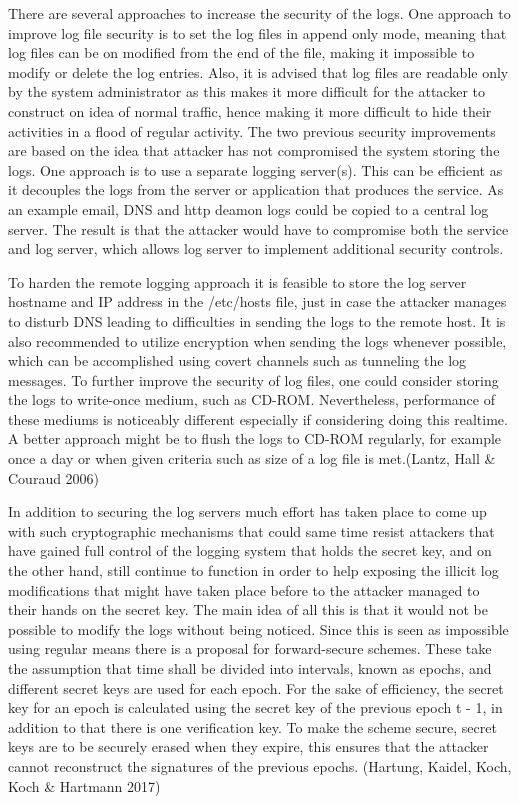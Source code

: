 \documentclass{article}
\begin{document}
There are several approaches to increase the security of the logs. One approach to improve log file security is to set the log files in append only mode, meaning that log files can be on modified from the end of the file, making it impossible to modify or delete the log entries. Also, it is advised that log files are readable only by the system administrator as this makes it more difficult for the attacker to construct on idea of normal traffic, hence making it more difficult to hide their activities in a flood of regular activity. The two previous security improvements are based on the idea that attacker has not compromised the system storing the logs.  One approach is to use a separate logging server(s). This can be efficient as it decouples the logs from the server or application that produces the service. As an example email, DNS and http deamon logs could be copied to a central log server. The result is that the attacker would have to compromise both the service and log server, which allows log server to implement additional security controls.
\par
To harden the remote logging approach it is feasible to store the log server hostname and IP address in the /etc/hosts file, just in case the attacker manages to disturb DNS leading to difficulties in sending the logs to the remote host. It is also recommended to utilize encryption when sending the logs whenever possible, which can be accomplished using covert channels such as tunneling the log messages. To further improve the security of log files, one could consider storing the logs to write-once medium, such as CD-ROM. Nevertheless, performance of these mediums is noticeably different especially if considering doing this realtime. A better approach might be to flush the logs to CD-ROM regularly, for example once a day or when given criteria such as size of a log file is met.(Lantz, Hall \& Couraud 2006)
\par
In addition to securing the log servers much effort has taken place to come up with such cryptographic mechanisms that could same time resist attackers that have gained full control of the logging system that holds the secret key, and on the other hand, still continue to function in order to help exposing the illicit log modifications that might have taken place before to the attacker managed to their hands on the secret key. The main idea of all this is that it would not be possible to modify the logs without being noticed. Since this is seen as impossible using regular means there is a proposal for forward-secure schemes. These take the assumption that time shall be divided into intervals, known as epochs, and different secret keys are used for each epoch. For the sake of efficiency, the secret key for an epoch is calculated using the secret key of the previous epoch t - 1, in addition to that there is one verification key. To make the scheme secure, secret keys are to be securely erased when they expire, this ensures that the attacker cannot reconstruct the signatures of the previous epochs. (Hartung, Kaidel, Koch, Koch \& Hartmann 2017)
\end{document}
